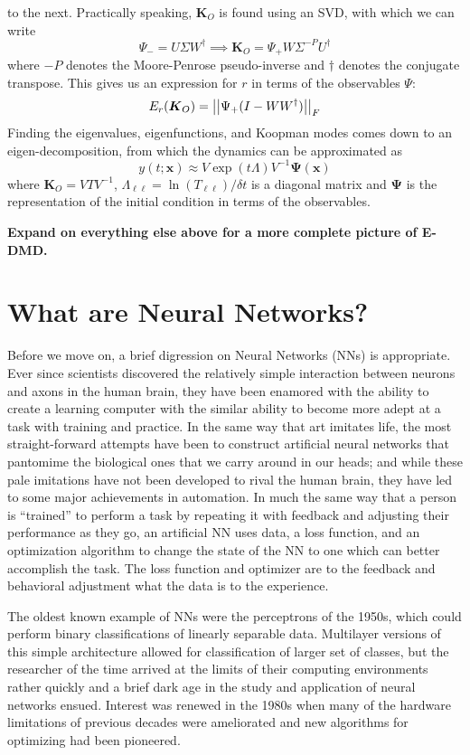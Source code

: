 to the next. Practically speaking, $\boldsymbol{K}_O$ is found
using an SVD, with which we can write
$$\Psi_- = U\Sigma W^{\dagger} \implies \boldsymbol{K}_O = \Psi_+W\Sigma^{-P}
U^{\dagger}$$
where $-P$ denotes the Moore-Penrose pseudo-inverse and $\dagger$ denotes the 
conjugate transpose. This gives us an expression for $r$ in terms of the 
observables $\Psi$:
$$E_r(\boldsymbol{K}_O) = \left|\left|\Psi_+(I - WW^\dagger)\right|\right|_F$$
Finding the eigenvalues, eigenfunctions, and Koopman modes comes down to an 
eigen-decomposition, from which the dynamics can be approximated as 
$$y(t;\boldsymbol{x}) \approx V\exp(t\Lambda)V^{-1}\boldsymbol{\Psi}
(\boldsymbol{x})$$
where $\boldsymbol{K}_O = VTV^{-1}$, $\Lambda_{\ell\ell} = \ln(T_{\ell\ell})/
\delta t$ is a diagonal matrix and $\boldsymbol{\Psi}$ is the representation 
of the initial condition in terms of the observables. 

\textbf{Expand on everything else above for a more complete picture of E-DMD.}

\section{What are Neural Networks?}

Before we move on, a brief digression on Neural Networks (NNs) is appropriate. Ever since
scientists discovered the relatively simple interaction between neurons and axons in 
the human brain, they have been enamored with the ability to create a learning computer 
with the similar ability to become more adept at a task with training and practice. 
In the same way that art imitates life, the most straight-forward attempts have been 
to construct artificial neural networks that pantomime the biological ones that we carry 
around in our heads; and while these pale imitations have not been developed to rival the 
human brain, they have led to some major achievements in automation. In much the same 
way that a person is ``trained'' to perform a task by repeating it with feedback and 
adjusting their performance as they go, an artificial NN uses data, a loss function, and 
an optimization algorithm to change the state of the NN to one which can better accomplish 
the task. The loss function and optimizer are to the feedback and behavioral adjustment 
what the data is to the experience. 

The oldest known example 
of NNs were the perceptrons of the 1950s, which could perform binary classifications of 
linearly separable data. Multilayer versions of this simple architecture allowed for 
classification of larger set of classes, but the researcher of the time arrived at the 
limits of their computing environments rather quickly and a brief dark age in the study 
and application of neural networks ensued. Interest was renewed in the 1980s when many 
of the hardware limitations of previous decades were ameliorated and new algorithms for 
optimizing had been pioneered.

